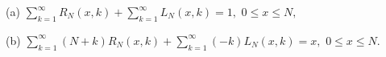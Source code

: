 (a) $\sum_{k=1}^{\infty} R_N(x,k) + \sum_{k=1}^{\infty} L_N(x,k) = 1,$ $0 \leq x \leq N,$

(b) $\sum_{k=1}^{\infty} (N+k)R_N(x,k) + \sum_{k=1}^{\infty} (-k)L_N(x,k) = x,$ $0 \leq x \leq N.$